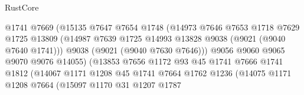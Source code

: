 \begin{lexlean}{RustCore}
\begin{coremodule}
                                      @1741
                                      @7669
                                      (@15135
                                        @7647
                                        @7654
                                        @1748
                                        (@14973
                                          @7646
                                          @7653
                                          @1718
                                          @7629
                                          @1725
                                          @13809
                                          (@14987
                                            @7639
                                            @1725
                                            @14993
                                            @13828
                                            @9038
                                            (@9021 (@9040 @7640 @1741)))
                                          @9038
                                          (@9021 (@9040 @7630 @7646)))
                                        @9056
                                        @9060
                                        @9065
                                        @9070
                                        @9076
                                        @14055)
                                      (@13853
                                        @7656
                                        @1172
                                        @93
                                        @45
                                        @1741
                                        @7666
                                        @1741
                                        @1812
                                        (@14067
                                          @1171
                                          @1208
                                          @45
                                          @1741
                                          @7664
                                          @1762
                                          @1236
                                          (@14075
                                            @1171
                                            @1208
                                            @7664
                                            (@15097
                                              @1170
                                              @31
                                              @1207
                                              @1787

\end{coremodule}
\end{lexlean}
